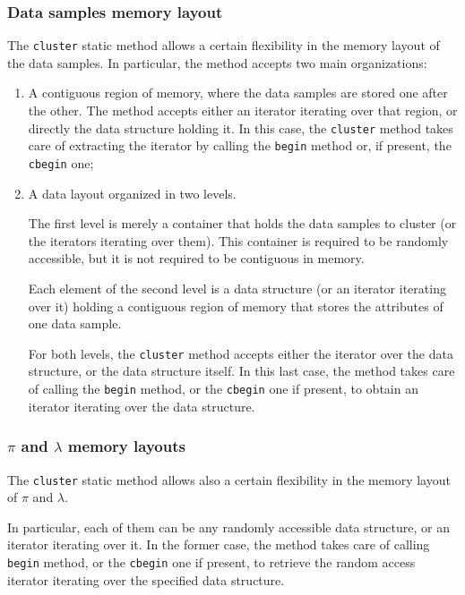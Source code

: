 \documentclass{article}
\begin{document}
\hypertarget{par-data-samples-layout}{
\subsubsection{Data samples memory layout}
\label{par-data-samples-layout}}

The \texttt{cluster} static method allows a certain flexibility in the memory layout of the data
samples. In particular, the method accepts two main organizations:
\begin{enumerate}
\item A contiguous region of memory, where the data samples are stored one after the other.
The method accepts either an iterator iterating over that region, or directly the data
structure holding it. In this case, the \texttt{cluster} method takes care of extracting the
iterator by calling the \texttt{begin} method or, if present, the \texttt{cbegin} one;

\item A data layout organized in two levels.

The first level is merely a container that holds the data samples to cluster (or the iterators
iterating over them). This container is required to be randomly accessible, but it is not
required to be contiguous in memory.

Each element of the second level is a data structure (or an iterator iterating over it) holding a
contiguous region of memory that stores the attributes of one data sample.

For both levels, the \texttt{cluster} method accepts either the iterator over the data structure, or
the data structure itself. In this last case, the method takes care of calling the
\texttt{begin} method, or the \texttt{cbegin} one if present, to obtain an iterator iterating
over the data structure.

\end{enumerate}

\hypertarget{par-pi-lambda-layout}{
\subsubsection{\boldmath$\pi$ and \boldmath$\lambda$ memory layouts}
\label{par-pi-lambda-layout}}

The \texttt{cluster} static method allows also a certain flexibility in the memory layout of
$\pi$ and $\lambda$.

In particular, each of them can be any randomly accessible data structure, or an iterator
iterating over it.
In the former case, the method takes care of calling \texttt{begin} method, or the
\texttt{cbegin} one if present, to retrieve the random access iterator iterating over the
specified data structure.
\end{document}
